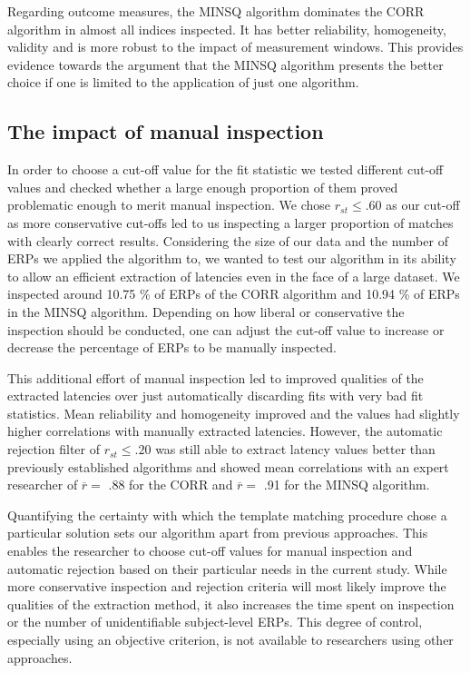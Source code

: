 \documentclass[
  man]{apa7}
\begin{document}
Regarding outcome measures, the MINSQ algorithm dominates the CORR algorithm in almost all indices inspected. It has better reliability, homogeneity, validity and is more robust to the impact of measurement windows. This provides evidence towards the argument that the MINSQ algorithm presents the better choice if one is limited to the application of just one algorithm.

\hypertarget{the-impact-of-manual-inspection}{%
\subsection{The impact of manual inspection}\label{the-impact-of-manual-inspection}}

In order to choose a cut-off value for the fit statistic we tested different cut-off values and checked whether a large enough proportion of them proved problematic enough to merit manual inspection. We chose \(r_{st} \le .60\) as our cut-off as more conservative cut-offs led to us inspecting a larger proportion of matches with clearly correct results. Considering the size of our data and the number of ERPs we applied the algorithm to, we wanted to test our algorithm in its ability to allow an efficient extraction of latencies even in the face of a large dataset. We inspected around 10.75 \% of ERPs of the CORR algorithm and 10.94 \% of ERPs in the MINSQ algorithm. Depending on how liberal or conservative the inspection should be conducted, one can adjust the cut-off value to increase or decrease the percentage of ERPs to be manually inspected.

This additional effort of manual inspection led to improved qualities of the extracted latencies over just automatically discarding fits with very bad fit statistics. Mean reliability and homogeneity improved and the values had slightly higher correlations with manually extracted latencies. However, the automatic rejection filter of \(r_{st} \le .20\) was still able to extract latency values better than previously established algorithms and showed mean correlations with an expert researcher of \(\overline{r} =\) .88 for the CORR and \(\overline{r} =\) .91 for the MINSQ algorithm.

Quantifying the certainty with which the template matching procedure chose a particular solution sets our algorithm apart from previous approaches. This enables the researcher to choose cut-off values for manual inspection and automatic rejection based on their particular needs in the current study. While more conservative inspection and rejection criteria will most likely improve the qualities of the extraction method, it also increases the time spent on inspection or the number of unidentifiable subject-level ERPs. This degree of control, especially using an objective criterion, is not available to researchers using other approaches.
\end{document}
